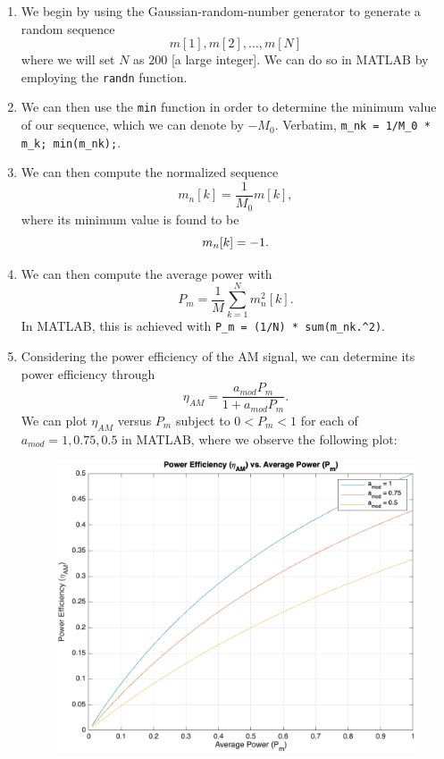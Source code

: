 \documentclass[11pt]{article}
\begin{document}
\begin{enumerate}[label=\textbf{\alph*)}, leftmargin=2.6em]
    \item We begin by using the Gaussian-random-number generator to generate a random sequence
    \begin{equation}
        m[1], m[2], \dots, m[N]
    \end{equation}
    where we will set $N$ as $200$ [a large integer].
    We can do so in MATLAB by employing the \texttt{randn} function.

    \item We can then use the \texttt{min} function in order to determine the 
    minimum value of our sequence, which we can denote by $-M_0$. Verbatim, 
    \verb|m_nk = 1/M_0 * m_k; min(m_nk);|.

    \item We can then compute the normalized sequence
    \begin{equation}
        m_n[k] = \frac{1}{M_0}m[k],
    \end{equation}
    where its minimum value is found to be
    \begin{equation} \notag
        m_n[k] = -1.
    \end{equation}

    \item We can then compute the average power with
    \begin{equation}
        P_m = \frac{1}{M} \sum_{k=1}^{N} m^2_n[k].
    \end{equation}
    In MATLAB, this is achieved with \verb|P_m = (1/N) * sum(m_nk.^2)|.

    \item Considering the power efficiency of the AM signal, we can determine
    its power efficiency through
    \begin{equation}
        \eta_{AM} = \frac{a_{mod} P_m}{1+a_{mod} P_m}.
    \end{equation}
    We can plot $\eta_{AM}$ versus $P_m$ subject to $0<P_m<1$ for each of 
    $a_{mod}=1, 0.75, 0.5$ in MATLAB, where we observe the following plot:
    \begin{figure} [H]
        \centering
        \includegraphics[width=0.6\linewidth]{plot1.png}
    \end{figure}


\end{enumerate}
\end{document}
